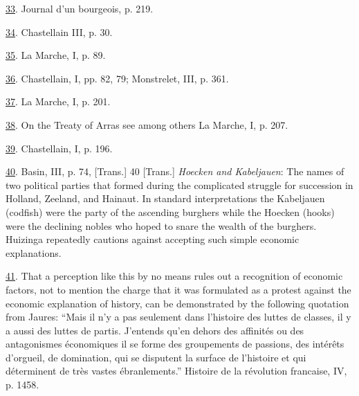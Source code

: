 \protect\hypertarget{23_NOTES.xhtmlux5cux23id_2166}{\protect\hyperlink{08_Chapter_One__THE_PASSIONATE_INTE.xhtmlux5cux23id_2165}{33}}.
Journal d'un bourgeois, p. 219.

\protect\hypertarget{23_NOTES.xhtmlux5cux23id_2164}{\protect\hyperlink{08_Chapter_One__THE_PASSIONATE_INTE.xhtmlux5cux23id_2163}{34}}.
Chastellain III, p. 30.

\protect\hypertarget{23_NOTES.xhtmlux5cux23id_2162}{\protect\hyperlink{08_Chapter_One__THE_PASSIONATE_INTE.xhtmlux5cux23id_2161}{35}}.
La Marche, I, p. 89.

\protect\hypertarget{23_NOTES.xhtmlux5cux23id_2160}{\protect\hyperlink{08_Chapter_One__THE_PASSIONATE_INTE.xhtmlux5cux23id_2159}{36}}.
Chastellain, I, pp. 82, 79; Monstrelet, III, p. 361.

\protect\hypertarget{23_NOTES.xhtmlux5cux23id_2158}{\protect\hyperlink{08_Chapter_One__THE_PASSIONATE_INTE.xhtmlux5cux23id_2157}{37}}.
La Marche, I, p. 201.

\protect\hypertarget{23_NOTES.xhtmlux5cux23id_2156}{\protect\hyperlink{08_Chapter_One__THE_PASSIONATE_INTE.xhtmlux5cux23id_2155}{38}}.
On the Treaty of Arras see among others La Marche, I, p. 207.

\protect\hypertarget{23_NOTES.xhtmlux5cux23id_2154}{\protect\hyperlink{08_Chapter_One__THE_PASSIONATE_INTE.xhtmlux5cux23id_2153}{39}}.
Chastellain, I, p. 196.

\protect\hypertarget{23_NOTES.xhtmlux5cux23id_2152}{\protect\hyperlink{08_Chapter_One__THE_PASSIONATE_INTE.xhtmlux5cux23id_2151}{40}}.
Basin, III, p. 74, {[}Trans.{]} 40 {[}Trans.{]} \emph{Hoecken and
Kabeljauen}: The names of two political parties that formed during the
complicated struggle for succession in Holland, Zeeland, and Hainaut. In
standard interpretations the Kabeljauen (codfish) were the party of the
ascending burghers while the Hoecken (hooks) were the declining nobles
who hoped to snare the wealth of the burghers. Huizinga repeatedly
cautions against accepting such simple economic explanations.

\protect\hypertarget{23_NOTES.xhtmlux5cux23id_2150}{\protect\hyperlink{08_Chapter_One__THE_PASSIONATE_INTE.xhtmlux5cux23id_2149}{41}}.
That a perception like this by no means rules out a recognition of
economic factors, not to mention the charge that it was formulated as a
protest against the economic explanation of history, can be demonstrated
by the following quotation from Jaures: ``Mais il n'y a pas seulement
dans l'histoire des luttes de classes, il y a aussi des luttes de
partis. J'entends qu'en dehors des affinités ou des antagonismes
économiques il se forme des groupements de passions, des intérêts
d'orgueil, de domination, qui se disputent la surface de l'histoire et
qui déterminent de très vastes ébranlements.'' Histoire de la révolution
francaise, IV, p. 1458.

